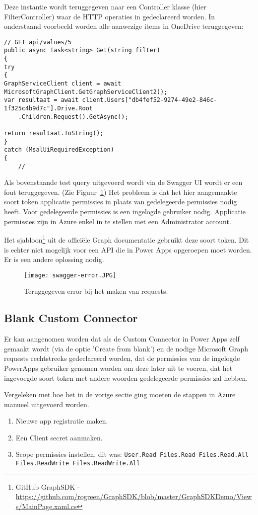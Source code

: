 Deze instantie wordt teruggegeven naar een Controller klasse (hier FilterController) waar de HTTP operaties in gedeclareerd worden. In onderstaand voorbeeld worden alle aanwezige items in OneDrive teruggegeven:
\begin{lstlisting}[style=CSharpStyle]
// GET api/values/5
public async Task<string> Get(string filter)
{
try
{
GraphServiceClient client = await MicrosoftGraphClient.GetGraphServiceClient2();
var resultaat = await client.Users["db4fef52-9274-49e2-846c-1f325c4b9d7c"].Drive.Root
    .Children.Request().GetAsync();

return resultaat.ToString();
}
catch (MsalUiRequiredException)
{
    //
\end{lstlisting}

Als bovenstaande test query uitgevoerd wordt via de Swagger UI wordt er een fout teruggegeven. (Zie Figuur~\ref{fig:swagger-error})
Het probleem is dat het hier aangemaakte soort token applicatie permissies in plaats van gedelegeerde permissies nodig heeft. Voor gedelegeerde permissies is een ingelogde gebruiker nodig. Applicatie permissies zijn in Azure enkel in te stellen met een Administrator account.

Het sjabloon\footnote{GitHub GraphSDK - \url{https://github.com/rogreen/GraphSDK/blob/master/GraphSDKDemo/Views/MainPage.xaml.cs}} uit de officiële Graph documentatie gebruikt deze soort token.\autocite{MicrosoftDocs2020d} Dit is echter niet mogelijk voor een API die in Power Apps opgeroepen moet worden. Er is een andere oplossing nodig.

\begin{figure}[h!]
    \texttt{[image: swagger-error.JPG]}
    \caption{Teruggegeven error bij het maken van requests.}
    \label{fig:swagger-error}
\end{figure}

\subsection{Blank Custom Connector}

Er kan aangenomen worden dat als de Custom Connector in Power Apps zelf gemaakt wordt (via de optie 'Create from blank') en de nodige Microsoft Graph requests rechtstreeks gedeclareerd worden, dat de permissies van de ingelogde PowerApps gebruiker genomen worden om deze later uit te voeren, dat het ingevoegde soort token met andere woorden gedelegeerde permissies zal hebben.

Vergeleken met hoe het in de vorige sectie ging moeten de stappen in Azure manueel uitgevoerd worden.
\begin{enumerate}
    \item Nieuwe app registratie maken.
    \item Een Client secret aanmaken.
    \item Scope permissies instellen, dit was: \lstinline|User.Read Files.Read Files.Read.All Files.ReadWrite Files.ReadWrite.All|
\end{enumerate}

